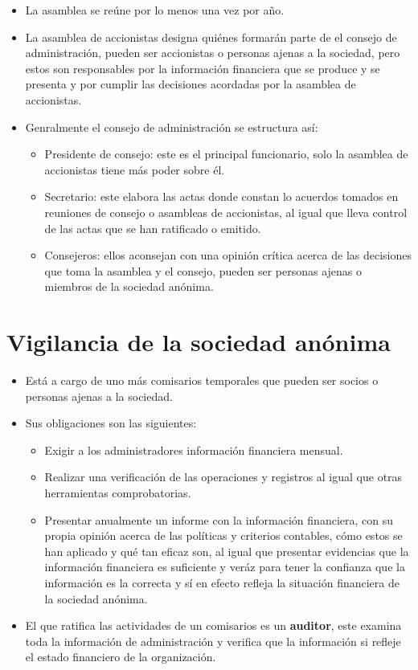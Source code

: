 \documentclass{article}
\begin{document}
\begin{itemize}
    \item La asamblea se reúne por lo menos una vez por año.
    \item La asamblea de accionistas designa quiénes formarán parte de el consejo de administración, pueden ser accionistas o personas ajenas a la sociedad, pero estos son responsables por la información financiera que se produce y se presenta y por cumplir las decisiones acordadas por la asamblea de accionistas.
    \item Genralmente el consejo de administración se estructura así:
    \begin{itemize}
        \item Presidente de consejo: este es el principal funcionario, solo la asamblea de accionistas tiene más poder sobre él.
        \item Secretario: este elabora las actas donde constan lo acuerdos tomados en reuniones de consejo o asambleas de accionistas, al igual que lleva control de las actas que se han ratificado o emitido.
        \item Consejeros: ellos aconsejan con una opinión crítica acerca de las decisiones que toma la asamblea y el consejo, pueden ser personas ajenas o miembros de la sociedad anónima. 
    \end{itemize}
\end{itemize}

\section{Vigilancia de la sociedad anónima}
\begin{itemize}
    \item Está a cargo de uno más comisarios temporales que pueden ser socios o personas ajenas a la sociedad.
    \item Sus obligaciones son las siguientes:
    \begin{itemize}
        \item Exigir a los administradores información financiera mensual.
        \item Realizar una verificación de las operaciones y registros al igual que otras herramientas comprobatorias.
        \item Presentar anualmente un informe con la información financiera, con su propia opinión acerca de las políticas y criterios contables, cómo estos se han aplicado y qué tan eficaz son, al igual que presentar evidencias que la información financiera es suficiente y veráz para tener la confianza que la información es la correcta y sí en efecto refleja la situación financiera de la sociedad anónima.
    \end{itemize}
    
    \item El que ratifica las actividades de un comisarios es un \textbf{auditor}, este examina toda la información de administración y verifica que la información si refleje el estado financiero de la organización.
\end{itemize}
\end{document}
